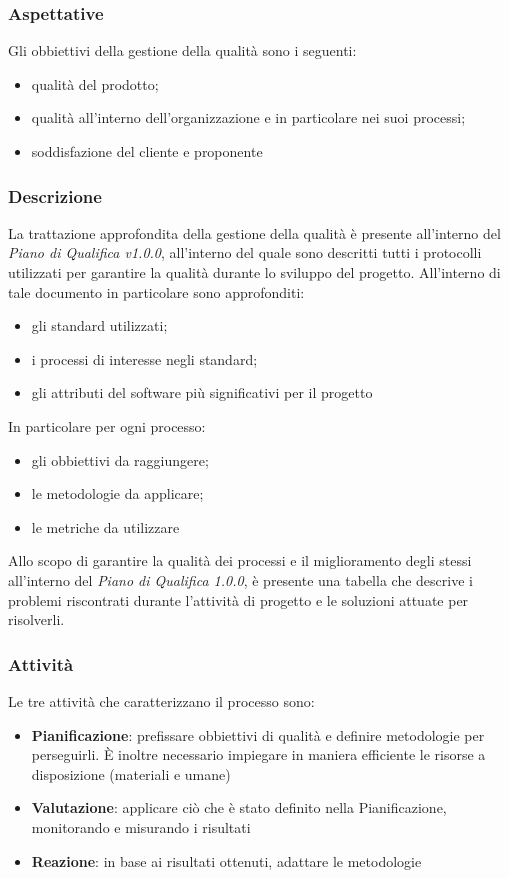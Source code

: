 		\subsubsection{Aspettative}
		Gli obbiettivi della gestione della qualità sono i seguenti:
		\begin{itemize}
			\item qualità del prodotto;
			\item qualità all'interno dell'organizzazione e in particolare nei suoi processi;
			\item soddisfazione del cliente e proponente
		\end{itemize}
		
		\subsubsection{Descrizione}
		La trattazione approfondita della gestione della qualità è presente all'interno del \textit{Piano di Qualifica v1.0.0}, all'interno del quale sono descritti tutti i protocolli utilizzati per garantire la qualità durante lo sviluppo del progetto. All'interno di tale documento in particolare sono approfonditi:
		\begin{itemize}
			\item gli standard utilizzati;
			\item i processi di interesse negli standard;
			\item gli attributi del software più significativi per il progetto
		\end{itemize}
		In particolare per ogni processo:
		\begin{itemize}
			\item gli obbiettivi da raggiungere;
			\item le metodologie da applicare;
			\item le metriche da utilizzare
		\end{itemize}
		Allo scopo di garantire la qualità dei processi e il miglioramento degli stessi all'interno del \textit{Piano di Qualifica 1.0.0}, è presente una tabella che descrive i problemi riscontrati durante l'attività di progetto e le soluzioni attuate per risolverli.		
		
		\subsubsection{Attività}
		Le tre attività che caratterizzano il processo sono:
		\begin{itemize}
			\item \textbf{Pianificazione}: prefissare obbiettivi di qualità e definire metodologie per perseguirli. È inoltre necessario impiegare in maniera efficiente le risorse a disposizione (materiali e umane)
			\item \textbf{Valutazione}: applicare ciò che è stato definito nella Pianificazione, monitorando e misurando i risultati
			\item \textbf{Reazione}: in base ai risultati ottenuti, adattare le metodologie
		\end{itemize}
		
